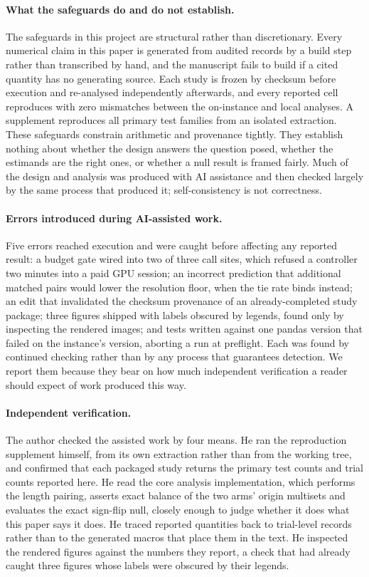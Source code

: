 \paragraph{What the safeguards do and do not establish.}
The safeguards in this project are structural rather than discretionary. Every
numerical claim in this paper is generated from audited records by a build
step rather than transcribed by hand, and the manuscript fails to build if a
cited quantity has no generating source. Each study is frozen by checksum
before execution and re-analysed independently afterwards, and every reported
cell reproduces with zero mismatches between the on-instance and local
analyses. A supplement reproduces all primary test families from an isolated
extraction. These safeguards constrain arithmetic and provenance tightly. They
establish nothing about whether the design answers the question posed, whether
the estimands are the right ones, or whether a null result is framed fairly.
Much of the design and analysis was produced with AI assistance and then
checked largely by the same process that produced it; self-consistency is not
correctness.

\paragraph{Errors introduced during AI-assisted work.}
Five errors reached execution and were caught before affecting any reported
result: a budget gate wired into two of three call sites, which refused a
controller two minutes into a paid GPU session; an incorrect prediction that
additional matched pairs would lower the resolution floor, when the tie rate
binds instead; an edit that invalidated the checksum provenance of an
already-completed study package; three figures shipped with labels obscured by
legends, found only by inspecting the rendered images; and tests written
against one pandas version that failed on the instance's version, aborting a
run at preflight. Each was found by continued checking rather than by any
process that guarantees detection. We report them because they bear on how
much independent verification a reader should expect of work produced this
way.

\paragraph{Independent verification.}
The author checked the assisted work by four means. He ran the reproduction
supplement himself, from its own extraction rather than from the working tree,
and confirmed that each packaged study returns the primary test counts and
trial counts reported here. He read the core analysis implementation, which
performs the length pairing, asserts exact balance of the two arms' origin
multisets and evaluates the exact sign-flip null, closely enough to judge
whether it does what this paper says it does. He traced reported quantities
back to trial-level records rather than to the generated macros that place
them in the text. He inspected the rendered figures against the numbers they
report, a check that had already caught three figures whose labels were
obscured by their legends.

